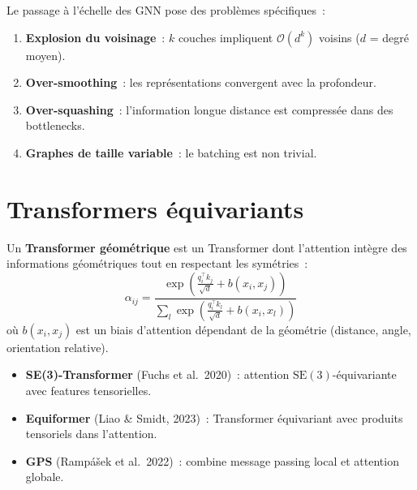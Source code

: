 \begin{proposition}
Le passage \`a l'\'echelle des GNN pose des probl\`emes sp\'ecifiques~:
\begin{enumerate}
  \item \textbf{Explosion du voisinage}~: $k$ couches impliquent
        $\mathcal{O}(d^k)$ voisins ($d$ = degr\'e moyen).
  \item \textbf{Over-smoothing}~: les repr\'esentations convergent
        avec la profondeur.
  \item \textbf{Over-squashing}~: l'information longue distance est
        compress\'ee dans des bottlenecks.
  \item \textbf{Graphes de taille variable}~: le batching est
        non trivial.
\end{enumerate}
\end{proposition}

\section{Transformers \'equivariants}
\label{sec:equivariant_transformers}

\begin{definition}
Un \textbf{Transformer g\'eom\'etrique} est un Transformer dont
l'attention int\`egre des informations g\'eom\'etriques tout en
respectant les sym\'etries~:
\[
  \alpha_{ij} = \frac{\exp\!\left(\frac{q_i^\top k_j}{\sqrt{d}}
  + b(x_i, x_j)\right)}{\sum_{l} \exp\!\left(
  \frac{q_i^\top k_l}{\sqrt{d}} + b(x_i, x_l)\right)}
\]
o\`u $b(x_i, x_j)$ est un biais d'attention d\'ependant de la
g\'eom\'etrie (distance, angle, orientation relative).
\end{definition}

\begin{exemple}
\begin{itemize}
  \item \textbf{SE(3)-Transformer} (Fuchs et al.\ 2020)~: attention
        $\mathrm{SE}(3)$-\'equivariante avec features tensorielles.
  \item \textbf{Equiformer} (Liao \& Smidt, 2023)~: Transformer
        \'equivariant avec produits tensoriels dans l'attention.
  \item \textbf{GPS} (Ramp\'a\v{s}ek et al.\ 2022)~: combine
        message passing local et attention globale.
\end{itemize}
\end{exemple}

